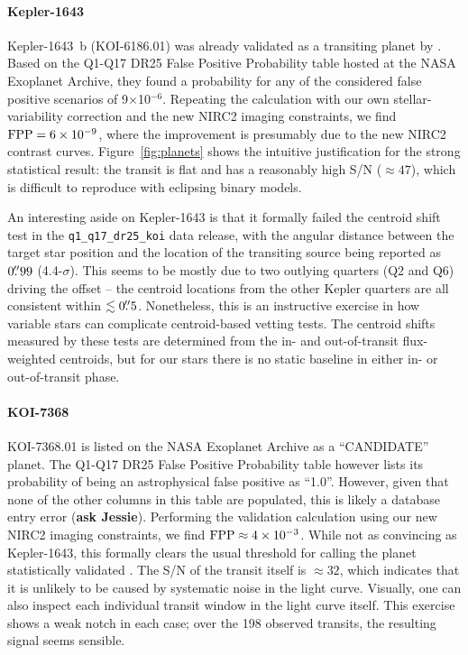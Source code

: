 \documentclass[12pt,twocolumn,linenumbers]{aastex63}
\begin{document}
\paragraph{Kepler-1643}
Kepler-1643~b (KOI-6186.01) was already validated as a transiting
planet by \citet{morton_false_2016}.  Based on the Q1-Q17 DR25 False
Positive Probability table hosted at the NASA Exoplanet Archive, they
found a probability for any of the considered false positive scenarios
of 9$\times$10$^{-6}$.  Repeating the calculation with our own
stellar-variability correction and the new NIRC2 imaging constraints,
we find ${\rm FPP} = 6\times10^{-9}$, where the improvement is
presumably due to the new NIRC2 contrast curves.
Figure~\ref{fig:planets} shows the intuitive justification for the
strong statistical result: the transit is flat and has a reasonably
high S/N ($\approx 47$), which is difficult to reproduce with
eclipsing binary models.

An interesting aside on Kepler-1643 is that it formally failed the
centroid shift test in the \texttt{q1\_q17\_dr25\_koi} data release,
with the angular distance between the target star position and the
location of the transiting source being reported as $0\mbox{$.\!\!^{\prime\prime}$}99$
(4.4-$\sigma$).  This seems to be mostly due to two outlying quarters
(Q2 and Q6) driving the offset -- the centroid locations from the
other Kepler quarters are all consistent within $\lesssim 0\mbox{$.\!\!^{\prime\prime}$}5$.
Nonetheless, this is an instructive exercise in how variable stars can
complicate centroid-based vetting tests.  The centroid shifts measured
by these tests are determined from the in- and out-of-transit
flux-weighted centroids, but for our stars there is no static baseline
in either in- or out-of-transit phase.

\paragraph{KOI-7368}
KOI-7368.01 is listed on the NASA Exoplanet Archive as a ``CANDIDATE''
planet.  The Q1-Q17 DR25 False Positive Probability table however
lists its probability of being an astrophysical false positive as
``1.0''. However, given that none of the other columns in this table
are populated, this is likely a database entry error ({\bf ask
Jessie}).  Performing the validation calculation using our new NIRC2
imaging constraints, we find ${\rm FPP} \approx 4\times10^{-3}$.
While not as convincing as Kepler-1643, this formally clears the
usual threshold for calling the planet statistically validated
\citep{morton_efficient_2012}.  The S/N of the transit itself is
$\approx 32$, which indicates that it is unlikely to be caused by
systematic noise in the light curve.  Visually, one can also inspect
each individual transit window in the light curve itself.  This
exercise shows a weak notch in each case; over the 198 observed
transits, the resulting signal seems sensible.
\end{document}
